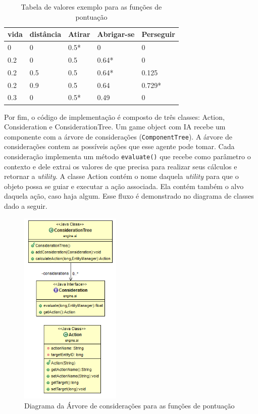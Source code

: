\documentclass[12pt, 
openright, 
oneside, 
a4paper,    
brazil]{facom-ufu-abntex2}
\begin{document}
 
\begin{table}[H]
\centering
\begin{tabular}{l l l l l}
vida & distância & Atirar & Abrigar-se & Perseguir \\
\hline		
0 & 0 & 0.5* & 0 & 0 \\
0.2 & 0 & 0.5 & 0.64* & 0 \\
0.2 & 0.5 & 0.5 & 0.64* & 0.125 \\
0.2 & 0.9 & 0.5 & 0.64 & 0.729* \\
0.3 & 0 & 0.5* & 0.49 & 0 \\

\end{tabular}
\caption{Tabela de valores exemplo para as funções de pontuação}
\end{table}

Por fim, o código de implementação é composto de três classes: Action, Consideration e ConsiderationTree. Um game object com IA recebe um componente com a árvore de considerações (\texttt{ComponentTree}). A árvore de considerações contem as possíveis ações que esse agente pode tomar. Cada consideração implementa um método \texttt{evaluate()} que recebe como parâmetro o contexto e dele extrai os valores de que precisa para realizar seus cálculos e retornar a \textit{utility}. A classe Action contém o nome daquela \textit{utility} para que o objeto possa se guiar e executar a ação associada. Ela contém também o alvo daquela ação, caso haja algum. Esse fluxo é demonstrado no diagrama de classes dado a seguir.

\begin{figure}[H]
	\centering
	\includegraphics[width=13em]{imagens/considerationTree.png}
	\caption{Diagrama da Árvore de considerações para as funções de pontuação}
\end{figure}
\end{document}
